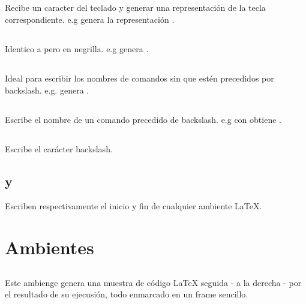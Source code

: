 \documentclass{article}
\begin{document}
	\subsection{}
		Recibe un caracter del teclado y generar una representación de la tecla correspondiente. e.g \texttt{\keystroke{\%}} genera la representación \keystroke{\%}.
		
	\subsection{}
		Identico a  pero en negrilla. e.g \texttt{} genera .
		
	\subsection{}
		Ideal para escribir los nombres de comandos sin que estén precedidos por backslash. e.g. \texttt{} genera .
		
	\subsection{}
		Escribe el nombre de un comando precedido de backslash. e.g con \texttt{} obtiene .
		
	\subsection{}	
		Escribe el carácter backslash.
		
	\subsection{ y }	
		Escriben respectivamente el inicio y fin de cualquier ambiente \LaTeX{}. 
		
	\section{Ambientes}
	
	\subsection{}
		Este ambienge genera una muestra de código \LaTeX{} seguida - a la derecha - por el resultado de su ejecusión, todo enmarcado en un frame sencillo.
		
\end{document}
